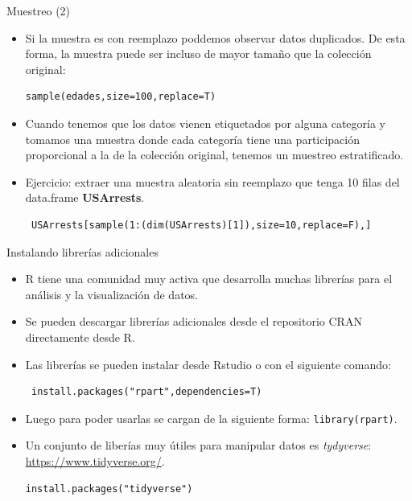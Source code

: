 \documentclass[handout]{beamer}
\begin{document}
\begin{frame}[fragile]{Muestreo (2)}
\scriptsize{
\begin{itemize}
 \item Si la muestra es con reemplazo poddemos observar datos duplicados. De esta forma, la muestra puede ser incluso de mayor tamaño que la colección original: 

\begin{verbatim}
sample(edades,size=100,replace=T)
\end{verbatim}
 
 \item Cuando tenemos que los datos vienen etiquetados por alguna categoría y tomamos una muestra donde cada categoría tiene una participación proporcional a la de la colección original, tenemos un muestreo estratificado. 
 
 \item Ejercicio: extraer una muestra aleatoria sin reemplazo que tenga 10 filas del data.frame \textbf{USArrests}. \pause
 
 \begin{verbatim}
 USArrests[sample(1:(dim(USArrests)[1]),size=10,replace=F),]
 \end{verbatim}

\end{itemize}



}
\end{frame}






\begin{frame}[fragile]{Instalando librerías adicionales}
\scriptsize{
\begin{itemize}
 \item R tiene una comunidad muy activa que desarrolla muchas librerías para el análisis y la visualización de datos.
 \item Se pueden descargar librerías adicionales desde el repositorio CRAN directamente desde R.
 \item Las librerías se pueden instalar desde Rstudio o con el siguiente comando:
 \begin{verbatim}
 install.packages("rpart",dependencies=T)
\end{verbatim} 

\item Luego para poder usarlas se cargan de la siguiente forma: \verb+library(rpart)+.

\item Un conjunto de liberías muy útiles para manipular datos es \textit{tydyverse}:  \url{https://www.tidyverse.org/}.

 \begin{verbatim}
install.packages("tidyverse")
\end{verbatim} 


 
 \end{itemize}

 
}
 
\end{frame}
\end{document}
